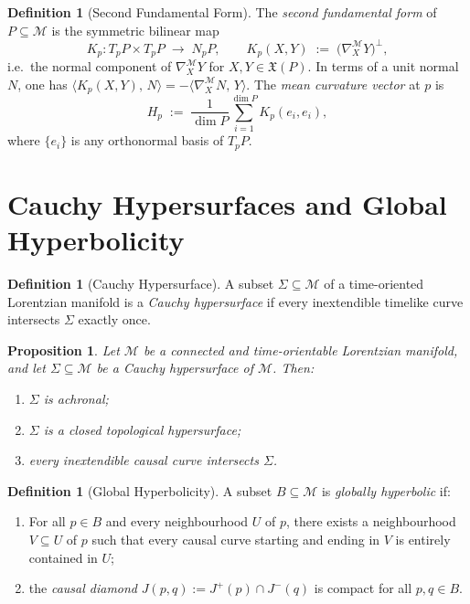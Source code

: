 \documentclass[12pt, a4paper]{article}
\theoremstyle{plain}
\newtheorem{proposition}[theorem]{Proposition}
\theoremstyle{definition}
\newtheorem{definition}[theorem]{Definition}
\theoremstyle{remark}
\newcommand{\M}{\mathcal{M}}
\newcommand{\ls}[2]{\langle #1,\, #2 \rangle}
\begin{document}
\begin{definition}[Second Fundamental Form]
  The \emph{second fundamental form} of $P \subseteq \M$ is the
  symmetric bilinear map
  \[
    K_p \colon T_pP \times T_pP \;\longrightarrow\; N_pP,
    \qquad
    K_p(X,Y) \;:=\; \bigl(\nabla^{\M}_X Y\bigr)^\perp,
  \]
  i.e.\ the normal component of $\nabla^{\M}_X Y$ for $X, Y \in \mathfrak{X}(P)$.
  In terms of a unit normal $N$, one has $\ls{K_p(X,Y)}{N} = -\ls{\nabla^{\M}_X N}{Y}$.
  The \emph{mean curvature vector} at $p$ is
  \[
    H_p \;:=\; \frac{1}{\dim P}\sum_{i=1}^{\dim P} K_p(e_i, e_i),
  \]
  where $\{e_i\}$ is any orthonormal basis of $T_pP$.
\end{definition}


\section{Cauchy Hypersurfaces and Global Hyperbolicity}

\begin{definition}[Cauchy Hypersurface]
  A subset $\Sigma \subseteq \M$ of a time-oriented Lorentzian manifold is a
  \emph{Cauchy hypersurface} if every inextendible timelike curve
  intersects $\Sigma$ exactly once.
\end{definition}

\begin{proposition}
\label{prop:cauchy-properties}
  Let $\M$ be a connected and time-orientable Lorentzian manifold, and let
  $\Sigma \subseteq \M$ be a Cauchy hypersurface of $\M$. Then:
  \begin{enumerate}
    \item $\Sigma$ is achronal;
    \item $\Sigma$ is a closed topological hypersurface;
    \item every inextendible causal curve intersects $\Sigma$.
  \end{enumerate}
\end{proposition}

\begin{definition}[Global Hyperbolicity]
  A subset $B \subseteq \M$ is \emph{globally hyperbolic} if:
  \begin{enumerate}
    \item For all $p \in B$ and every neighbourhood $U$ of $p$, there exists
          a neighbourhood $V \subseteq U$ of $p$ such that every causal curve
          starting and ending in $V$ is entirely contained in $U$;
    \item the \emph{causal diamond} $J(p,q) := J^+(p) \cap J^-(q)$ is compact
          for all $p, q \in B$.
  \end{enumerate}
\end{definition}
\end{document}
